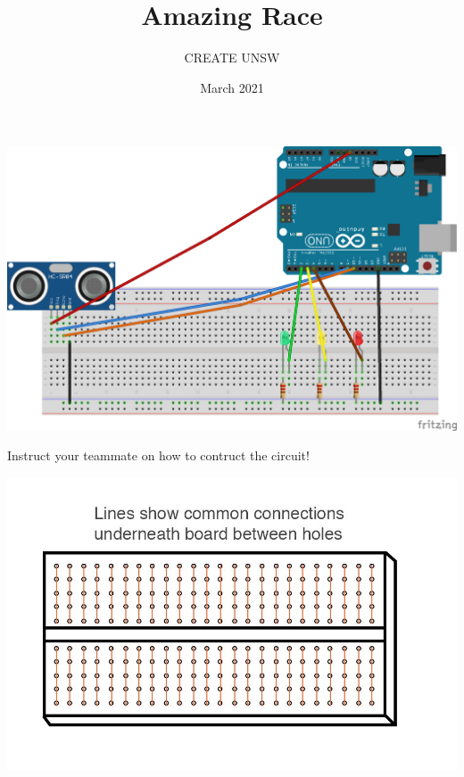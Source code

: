 \documentclass{article}
\title{Amazing Race}
\author{CREATE UNSW}
\date{March 2021}
\begin{document}
\includegraphics[width=\textwidth]{amazing race_bb.png}

Instruct your teammate on how to contruct the circuit!

\includegraphics[width=\textwidth]{breadboard.jpeg}
\end{document}
